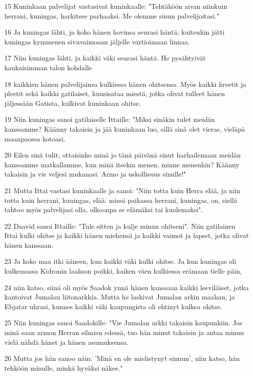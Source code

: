 \par 15 Kuninkaan palvelijat vastasivat kuninkaalle: "Tehtäköön aivan niinkuin herrani, kuningas, harkitsee parhaaksi. Me olemme sinun palvelijoitasi."
\par 16 Ja kuningas lähti, ja koko hänen hovinsa seurasi häntä; kuitenkin jätti kuningas kymmenen sivuvaimoaan jäljelle vartioimaan linnaa.
\par 17 Niin kuningas lähti, ja kaikki väki seurasi häntä. He pysähtyivät kaukaisimman talon kohdalle
\par 18 kaikkien hänen palvelijainsa kulkiessa hänen ohitsensa. Myös kaikki kreetit ja pleetit sekä kaikki gatilaiset, kuusisataa miestä, jotka olivat tulleet hänen jäljessään Gatista, kulkivat kuninkaan ohitse.
\par 19 Niin kuningas sanoi gatilaiselle Ittaille: "Miksi sinäkin tulet meidän kanssamme? Käänny takaisin ja jää kuninkaan luo, sillä sinä olet vieras, vieläpä maanpaossa kotoasi.
\par 20 Eilen sinä tulit; ottaisinko minä jo tänä päivänä sinut harhailemaan meidän kanssamme matkallamme, kun minä itsekin menen, minne menenkin? Käänny takaisin ja vie veljesi mukanasi. Armo ja uskollisuus sinulle!"
\par 21 Mutta Ittai vastasi kuninkaalle ja sanoi: "Niin totta kuin Herra elää, ja niin totta kuin herrani, kuningas, elää: missä paikassa herrani, kuningas, on, siellä tahtoo myös palvelijasi olla, olkoonpa se elämäksi tai kuolemaksi".
\par 22 Daavid sanoi Ittaille: "Tule sitten ja kulje minun ohitseni". Niin gatilainen Ittai kulki ohitse ja kaikki hänen miehensä ja kaikki vaimot ja lapset, jotka olivat hänen kanssaan.
\par 23 Ja koko maa itki ääneen, kun kaikki väki kulki ohitse. Ja kun kuningas oli kulkemassa Kidronin laakson poikki, kaiken väen kulkiessa erämaan tielle päin,
\par 24 niin katso, siinä oli myös Saadok ynnä hänen kanssaan kaikki leeviläiset, jotka kantoivat Jumalan liitonarkkia. Mutta he laskivat Jumalan arkin maahan, ja Ebjatar uhrasi, kunnes kaikki väki kaupungista oli ehtinyt kulkea ohitse.
\par 25 Niin kuningas sanoi Saadokille: "Vie Jumalan arkki takaisin kaupunkiin. Jos minä saan armon Herran silmien edessä, tuo hän minut takaisin ja antaa minun vielä nähdä hänet ja hänen asumuksensa.
\par 26 Mutta jos hän sanoo näin: 'Minä en ole mielistynyt sinuun', niin katso, hän tehköön minulle, minkä hyväksi näkee."
